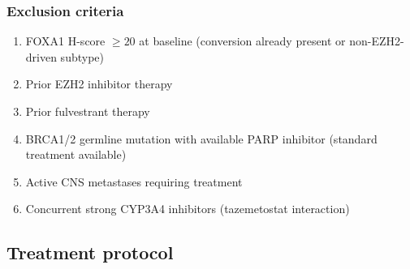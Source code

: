 \documentclass[12pt, a4paper]{article}
\begin{document}
\subsubsection{Exclusion criteria}

\begin{enumerate}
  \item FOXA1 H-score $\geq 20$ at baseline
        (conversion already present or non-EZH2-driven
        subtype)
  \item Prior EZH2 inhibitor therapy
  \item Prior fulvestrant therapy
  \item BRCA1/2 germline mutation with available
        PARP inhibitor (standard treatment available)
  \item Active CNS metastases requiring treatment
  \item Concurrent strong CYP3A4 inhibitors
        (tazemetostat interaction)
\end{enumerate}

\subsection{Treatment protocol}
\end{document}
